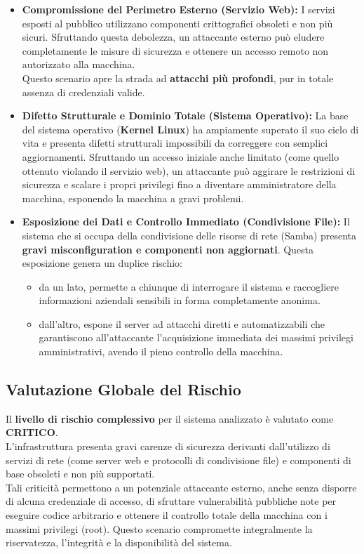 \documentclass[12pt, a4paper]{article}
\begin{document}
	\begin{itemize}
		\item \textbf{Compromissione del Perimetro Esterno (Servizio Web):} I servizi esposti al pubblico utilizzano componenti crittografici obsoleti e non più sicuri.
		Sfruttando questa debolezza, un attaccante esterno può eludere completamente le misure di sicurezza e ottenere un accesso remoto non autorizzato alla macchina.\\ 
		Questo scenario apre la strada ad \textbf{attacchi più profondi}, pur in totale assenza di credenziali valide.
		\item \textbf{Difetto Strutturale e Dominio Totale (Sistema Operativo):} La base del sistema operativo (\textbf{Kernel Linux}) ha ampiamente superato il suo ciclo di vita e presenta difetti strutturali impossibili da correggere con semplici aggiornamenti. 
		Sfruttando un accesso iniziale anche limitato (come quello ottenuto violando il servizio web), un attaccante può aggirare le restrizioni di sicurezza e scalare i propri privilegi fino a diventare amministratore della macchina, esponendo la macchina a gravi problemi.
		\newpage
		\item \textbf{Esposizione dei Dati e Controllo Immediato (Condivisione File):} Il sistema che si occupa della condivisione delle risorse di rete (Samba) presenta \textbf{gravi misconfiguration e componenti non aggiornati}.
		Questa esposizione genera un duplice rischio: 
		\begin{itemize}
			\item[*] da un lato, permette a chiunque di interrogare il sistema e raccogliere informazioni aziendali sensibili in forma completamente anonima.
			\item[*] dall'altro, espone il server ad attacchi diretti e automatizzabili che garantiscono all'attaccante l'acquisizione immediata dei massimi privilegi amministrativi, avendo il pieno controllo della macchina.
		\end{itemize} 
		
	\end{itemize}

	\vspace{2 cm}

	\subsection{Valutazione Globale del Rischio}
	Il \textbf{livello di rischio complessivo} per il sistema analizzato è valutato come \textbf{CRITICO}.\\
	L'infrastruttura presenta gravi carenze di sicurezza derivanti dall'utilizzo di servizi di rete (come server web e protocolli di condivisione file) e componenti di base obsoleti e non più supportati. \\
	Tali criticità permettono a un potenziale attaccante esterno, anche senza disporre di alcuna credenziale di accesso, di sfruttare vulnerabilità pubbliche note per eseguire codice arbitrario e ottenere il controllo totale della macchina con i massimi privilegi (root). 
	Questo scenario compromette integralmente la riservatezza, l'integrità e la disponibilità del sistema. \newline
\end{document}
